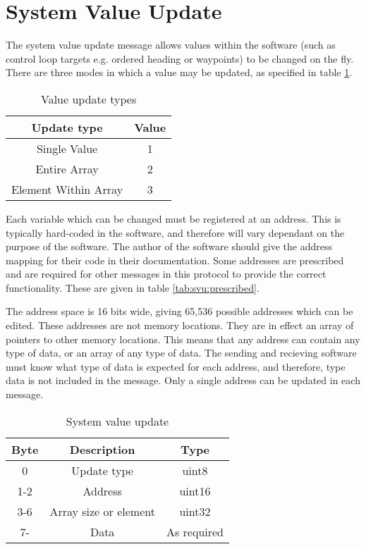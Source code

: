 \section{System Value Update}
\label{msg008}
The system value update message allows values within the software (such as control loop targets e.g. ordered heading or waypoints) to be changed on the fly. There are three modes in which a value may be updated, as specified in table \ref{tab:svu:updTypes}.

\begin{table}[H]
  \centering
  \begin{tabular}{ c c }
    Update type           & Value\\
\hline
    Single Value          & 1 \\
    Entire Array          & 2 \\
    Element Within Array  & 3 \\
  \end{tabular}
  \caption{Value update types}
  \label{tab:svu:updTypes}
\end{table}

Each variable which can be changed must be registered at an address. This is typically hard-coded in the software, and therefore will vary dependant on the purpose of the software. The author of the software should give the address mapping for their code in their documentation. Some addresses are prescribed and are required for other messages in this protocol to provide the correct functionality. These are given in table \ref{tab:svu:prescribed}. 

The address space is 16 bits wide, giving 65,536 possible addresses which can be edited. These addresses are not memory locations. They are in effect an array of pointers to other memory locations. This means that any address can contain any type of data, or an array of any type of data. The sending and recieving software must know what type of data is expected for each address, and therefore, type data is not included in the message. Only a single address can be updated in each message.

\begin{table}[H]
  \centering
  \begin{tabular}{ c c c }
  Byte & Description & Type \\
\hline
    0   & Update type & uint8 \\
   1-2  & Address     & uint16 \\
   3-6  & Array size or element & uint32 \\
   7-   & Data & As required \\
  \end{tabular}
  \caption{System value update}
\end{table}

